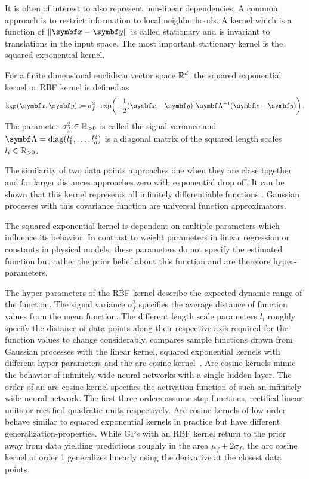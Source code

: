 It is often of interest to also represent non-linear dependencies.
A common approach is to restrict information to local neighborhoods.
A kernel which is a function of $\norm{\mat{x} - \mat{y}}$ is called stationary and is invariant to translations in the input space.
The most important stationary kernel is the squared exponential kernel.
\begin{definition}
    \label{def:gp:rbf_kernel}
    For a finite dimensional euclidean vector space $\mathbb{R}^d$, the squared exponential kernel or RBF kernel is defined as
    \begin{align}
        \K_{\text{SE}}(\mat{x}, \mat{y}) \coloneqq \sigma_f^2 \cdot \exp\!\left( -\frac{1}{2} (\mat{x} - \mat{y})\tran \mat{\Lambda}^{-1} (\mat{x} - \mat{y}) \right).
    \end{align}
    The parameter $\sigma_f^2 \in \mathbb{R}_{>0}$ is called the signal variance and $\mat{\Lambda} = \diag(l_1^2, \dots, l_d^2)$ is a diagonal matrix of the squared length scales $l_i \in \mathbb{R}_{>0}$.
\end{definition}
The similarity of two data points approaches one when they are close together and for larger distances approaches zero with exponential drop off.
It can be shown that this kernel represents all infinitely differentiable functions \cite{rasmussen_gaussian_2006}.
Gaussian processes with this covariance function are universal function approximators.

The squared exponential kernel is dependent on multiple parameters which influence its behavior.
In contrast to weight parameters in linear regression or constants in physical models, these parameters do not specify the estimated function but rather the prior belief about this function and are therefore hyper-parameters.

The hyper-parameters of the RBF kernel describe the expected dynamic range of the function.
The signal variance $\sigma_f^2$ specifies the average distance of function values from the mean function.
The different length scale parameters $l_i$ roughly specify the distance of data points along their respective axis required for the function values to change considerably.
 compares sample functions drawn from Gaussian processes with the linear kernel, squared exponential kernels with different hyper-parameters and the arc cosine kernel~\parencite{cho_kernel_2009}.
Arc cosine kernels mimic the behavior of infinitely wide neural networks with a single hidden layer.
The order of an arc cosine kernel specifies the activation function of such an infinitely wide neural network.
The first three orders assume step-functions, rectified linear units or rectified quadratic units respectively.
Arc cosine kernels of low order behave similar to squared exponential kernels in practice but have different generalization-properties.
While GPs with an RBF kernel return to the prior away from data yielding predictions roughly in the area $\mu_f \pm 2\sigma_f$, the arc cosine kernel of order 1 generalizes linearly using the derivative at the closest data points.

